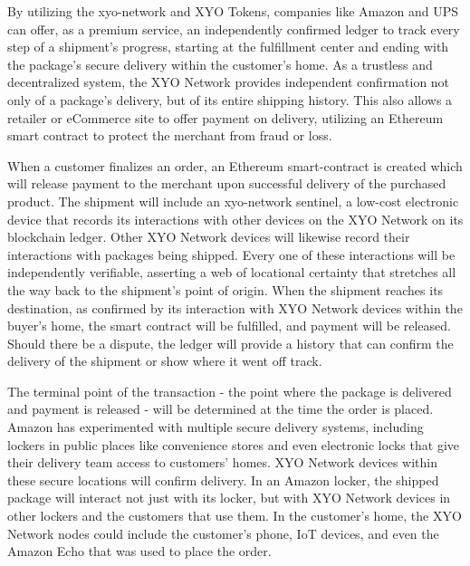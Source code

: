 \documentclass{article}
\begin{document}
By utilizing the \Gls{xyo-network} and XYO Tokens, companies like Amazon and UPS can offer, as a premium service, an independently confirmed ledger to track every step of a shipment's progress, starting at the fulfillment center and ending with the package's secure delivery within the customer's home. As a trustless and decentralized system, the XYO Network provides independent confirmation not only of a package's delivery, but of its entire shipping history. This also allows a retailer or eCommerce site to offer payment on delivery, utilizing an Ethereum smart contract to protect the merchant from fraud or loss.

When a customer finalizes an order, an Ethereum \gls{smart-contract} is created which will release payment to the merchant upon successful delivery of the purchased product. The shipment will include an \Gls{xyo-network} \Gls{sentinel}, a low-cost electronic device that records its interactions with other devices on the XYO Network on its blockchain ledger. Other XYO Network devices will likewise record their interactions with packages being shipped. Every one of these interactions will be independently verifiable, asserting a web of locational certainty that stretches all the way back to the shipment's point of origin. When the shipment reaches its destination, as confirmed by its interaction with XYO Network devices within the buyer's home, the smart contract will be fulfilled, and payment will be released. Should there be a dispute, the ledger will provide a history that can confirm the delivery of the shipment or show where it went off track.

The terminal point of the transaction - the point where the package is delivered and payment is released - will be determined at the time the order is placed. Amazon has experimented with multiple secure delivery systems, including lockers in public places like convenience stores and even electronic locks that give their delivery team access to customers' homes. XYO Network devices within these secure locations will confirm delivery. In an Amazon locker, the shipped package will interact not just with its locker, but with XYO Network devices in other lockers and the customers that use them. In the customer's home, the XYO Network nodes could include the customer's phone, IoT devices, and even the Amazon Echo that was used to place the order.
\end{document}
